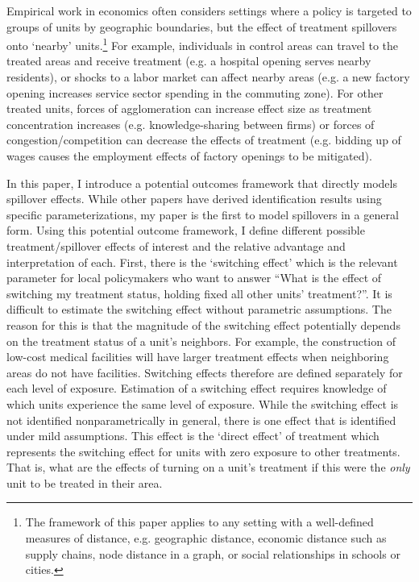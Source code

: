 \documentclass[11pt]{article}
\begin{document}
Empirical work in economics often considers settings where a policy is targeted to groups of units by geographic boundaries, but the effect of treatment spillovers onto `nearby' units.\footnote{The framework of this paper applies to any setting with a well-defined measures of distance, e.g. geographic distance, economic distance such as supply chains, node distance in a graph, or social relationships in schools or cities.} For example, individuals in control areas can travel to the treated areas and receive treatment (e.g. a hospital opening serves nearby residents), or shocks to a labor market can affect nearby areas (e.g. a new factory opening increases service sector spending in the commuting zone). For other treated units, forces of agglomeration can increase effect size as treatment concentration increases (e.g. knowledge-sharing between firms) or forces of congestion/competition can decrease the effects of treatment (e.g. bidding up of wages causes the employment effects of factory openings to be mitigated). 

In this paper, I introduce a potential outcomes framework that directly models spillover effects. While other papers have derived identification results using specific parameterizations, my paper is the first to model spillovers in a general form. Using this potential outcome framework, I define different possible treatment/spillover effects of interest and the relative advantage and interpretation of each. First, there is the `switching effect' which is the relevant parameter for local policymakers who want to answer ``What is the effect of switching my treatment status, holding fixed all other units' treatment?''. It is difficult to estimate the switching effect without parametric assumptions. The reason for this is that the magnitude of the switching effect potentially depends on the treatment status of a unit's neighbors. For example, the construction of low-cost medical facilities will have larger treatment effects when neighboring areas do not have facilities. Switching effects therefore are defined separately for each level of exposure. Estimation of a switching effect requires knowledge of which units experience the same level of exposure. While the switching effect is not identified nonparametrically in general, there is one effect that is identified under mild assumptions. This effect is the `direct effect' of treatment which represents the switching effect for units with zero exposure to other treatments. That is, what are the effects of turning on a unit's treatment if this were the \emph{only} unit to be treated in their area. 
\end{document}
